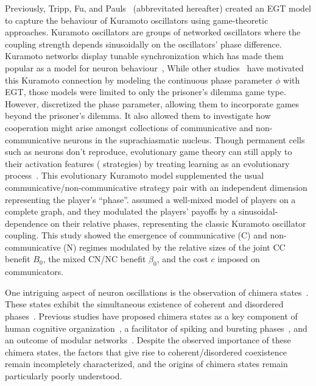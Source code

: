 \documentclass[pdflatex,twocolumn,sn-nature,super]{sn-jnl}
\begin{document}
Previously, Tripp, Fu, and Pauls~\citep{tripp2022evolutionary} (abbrevitated \tripp{} hereafter)
created an EGT model
to capture the behaviour of Kuramoto oscillators
using game-theoretic approaches.
Kuramoto oscillators are groups of networked oscillators
where the coupling strength depends sinusoidally
on the oscillators' phase difference.
Kuramoto networks display tunable synchronization
which has made them popular
as a model for neuron behaviour~\citep{cabral2011role,deng2024chimera},
While other studies~\citep{antonioni2017coevolution}
have motivated this Kuramoto connection
by modeling the continuous phase parameter $\phi$ with EGT,
those models were limited to only the prisoner's dilemma game type.
However, \tripp{} discretized the phase parameter,
allowing them to incorporate games beyond the prisoner's dilemma.
It also allowed them to investigate how cooperation might arise
amongst collections of communicative and non-communicative neurons
in the suprachiasmatic nucleus.
Though permanent cells such as neurons don't reproduce,
evolutionary game theory can still apply to their
activation features (\ie{} strategies)
by treating learning as
an evolutionary process~\citep{cohen2009evolutionary}.
This evolutionary Kuramoto model
supplemented the usual communicative/non-communicative
strategy pair with an independent dimension representing the player's ``phase''.
\tripp{} assumed a well-mixed model of players
on a complete graph,
and they modulated the players' payoffs
by a sinusoidal-dependence on their relative phases,
representing the classic Kuramoto oscillator coupling.
This study showed the emergence of communicative (C)
and non-communicative (N) regimes modulated by the relative sizes
of the joint CC benefit $B_0$, the mixed CN/NC benefit $\beta_0$,
and the cost $c$ imposed on communicators.

One intriguing aspect of neuron oscillations
is the observation of chimera states~\citep{majhi2019chimera}.
These states exhibit the simultaneous existence
of coherent and disordered phases~\citep{abrams2004chimera}.
Previous studies have proposed
chimera states as
a key component of human cognitive organization~\citep{bansal2019cognitive},
a facilitator of spiking and bursting phases~\citep{santos2017chimera},
and an outcome of modular networks~\citep{hizanidis2016chimera}.
Despite the observed importance of these chimera states,
the factors that give rise to coherent/disordered coexistence
remain incompletely characterized,
and the origins of chimera states
remain particularly poorly understood.
\end{document}
